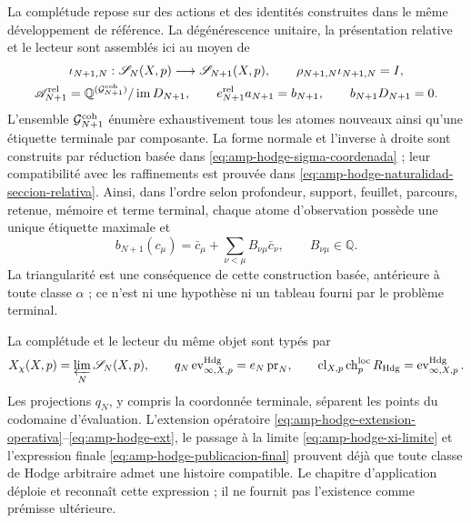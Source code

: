 La complétude repose sur des actions et des identités construites dans le même développement de référence. La dégénérescence unitaire, la présentation relative et le lecteur sont assemblés ici au moyen de
\begin{equation}\label{eq:pdf2-g-coh-datos-operativos}
\begin{gathered}
 \iota_{N+1,N}:\mathscr S_N(X,p)\longrightarrow\mathscr S_{N+1}(X,p),
 \qquad \rho_{N+1,N}\iota_{N+1,N}=I,\\
 \mathscr A_{N+1}^{\rm rel}
  =\mathbb Q^{(\mathcal G_{N+1}^{\rm coh})}/\operatorname{im}D_{N+1},
 \qquad e_{N+1}^{\rm rel}a_{N+1}=b_{N+1},
 \qquad b_{N+1}D_{N+1}=0.
\end{gathered}
\end{equation}
L’ensemble $\mathcal G_{N+1}^{\rm coh}$ énumère exhaustivement tous les atomes nouveaux ainsi qu’une étiquette terminale par composante. La forme normale et l’inverse à droite sont construits par réduction basée dans \eqref{eq:amp-hodge-sigma-coordenada} ; leur compatibilité avec les raffinements est prouvée dans \eqref{eq:amp-hodge-naturalidad-seccion-relativa}. Ainsi, dans l’ordre selon profondeur, support, feuillet, parcours, retenue, mémoire et terme terminal, chaque atome d’observation possède une unique étiquette maximale et
\begin{equation}\label{eq:pdf2-g-coh-tabla-dato}
 b_{N+1}(c_\mu)=\bar c_\mu+
   \sum_{\nu<\mu}B_{\nu\mu}\bar c_\nu,
 \qquad B_{\nu\mu}\in\mathbb Q.
\end{equation}
La triangularité est une conséquence de cette construction basée, antérieure à toute classe $\alpha$ ; ce n’est ni une hypothèse ni un tableau fourni par le problème terminal.

La complétude et le lecteur du même objet sont typés par
\begin{equation}\label{eq:pdf2-g-coh-limite-lector-dato}
 X_\chi(X,p)=\varprojlim_N\mathscr S_N(X,p),
 \qquad
 q_N\operatorname{ev}^{\rm Hdg}_{\infty,X,p}
  =e_N\operatorname{pr}_N,
 \qquad
 \operatorname{cl}_{X,p}\operatorname{ch}^{\rm loc}_pR_{\rm Hdg}
  =\operatorname{ev}^{\rm Hdg}_{\infty,X,p}.
\end{equation}
Les projections $q_N$, y compris la coordonnée terminale, séparent les points du codomaine d’évaluation. L’extension opératoire \eqref{eq:amp-hodge-extension-operativa}--\eqref{eq:amp-hodge-ext}, le passage à la limite \eqref{eq:amp-hodge-xi-limite} et l’expression finale \eqref{eq:amp-hodge-publicacion-final} prouvent déjà que toute classe de Hodge arbitraire admet une histoire compatible. Le chapitre d’application déploie et reconnaît cette expression ; il ne fournit pas l’existence comme prémisse ultérieure.

